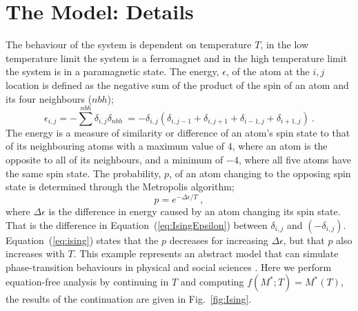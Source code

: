 \documentclass[11pt]{article}
\begin{document}
\section{The Model: Details} 
\label{sec:details}
The behaviour of the system is dependent on temperature $T$, in the low temperature limit the system is a ferromagnet and in the high temperature limit the system is in a paramagnetic state. The energy, $\epsilon$, of the atom at the $i,j$ location is defined as the negative sum of the product of the spin of an atom and its four neighbours ($nbh$);
 	\begin{equation}
 		\label{eq:IsingEpsilon}
		\epsilon_{i,j} = -\sum\limits^{nbh} \delta_{i,j}\delta_{nbh}~ 
		= -\delta_{i,j}\left(\delta_{i,j-1} + \delta_{i,j+1} + \delta_{i-1,j} + \delta_{i+1,j}\right)~.
	\end{equation}
	The energy is a measure of similarity or difference of an atom's spin state to that of its neighbouring atoms with a maximum value of $4$, where an atom is the opposite to all of its neighbours, and a minimum of $-4$, where all five atoms have the same spin state. The probability, $p$, of an atom changing to the opposing spin state is determined through the Metropolis algorithm; 
  	\begin{equation}
  		\label{eq:ising}
		p = e^{-\Delta\epsilon / T}~,
	\end{equation}	 
 	where $\Delta\epsilon$ is the difference in energy caused by an atom changing its spin state. That is the difference in Equation~(\ref{eq:IsingEpsilon}) between $\delta_{i,j}$ and $(-\delta_{i,j})$. Equation~(\ref{eq:ising}) states that the $p$ decreases for increasing $\Delta\epsilon$, but that $p$ also increases with $T$. This example represents an abstract model that can simulate phase-transition behaviours in physical and social sciences \cite{Ising}. Here we perform equation-free analysis by continuing in $T$ and computing $f(M^\ast;T) = M^\ast(T)$, the results of the continuation are given in Fig.~\ref{fig:Ising}. 
\end{document}
